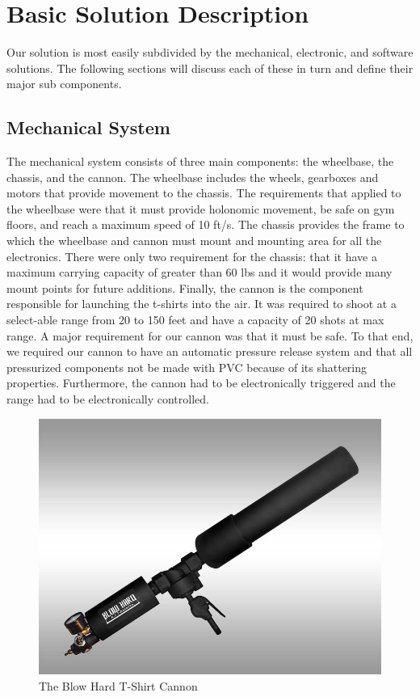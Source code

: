 \documentclass[letterpaper,12pt]{article}
\begin{document}
\section{Basic Solution Description}
\label{sec:basicsoldesc}

Our solution is most easily subdivided by the mechanical, electronic, and
software solutions. The following sections will discuss each of these in turn
and define their major sub components.

\subsection{Mechanical System}
The mechanical system consists of three main components: the wheelbase, the
chassis, and the cannon. The wheelbase includes the wheels, gearboxes and
motors that provide movement to the chassis. The requirements that applied to
the wheelbase were that it must provide holonomic movement, be safe on gym
floors, and reach a maximum speed of 10 ft/s. The chassis provides the frame to
which the wheelbase and cannon must mount and mounting area for all the
electronics. There were only two requirement for the chassis: that it have
a maximum carrying capacity of greater than 60 lbs and it would provide many
mount points for future additions. Finally, the cannon is the component
responsible for launching the t-shirts into the air. It was required to shoot
at a select-able range from 20 to 150 feet and have a capacity of 20 shots at
max range. A major requirement for our cannon was that it must be safe. To that
end, we required our cannon to have an automatic pressure release system and
that all pressurized components not be made with PVC because of its shattering
properties. Furthermore, the cannon had to be electronically triggered and the
range had to be electronically controlled.

\begin{figure}[h!]
  \centering
  \includegraphics[width=15cm]{./pics/cannon/blowhard_cannon.jpg}
  \caption{The Blow Hard T-Shirt Cannon}
  \label{fig:cannon}
\end{figure}
\end{document}
